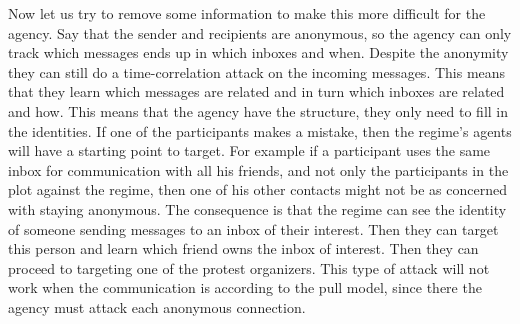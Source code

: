 Now let us try to remove some information to make this more difficult for the 
agency.
Say that the sender and recipients are anonymous, so the agency can only track 
which messages ends up in which inboxes and when.
Despite the anonymity they can still do a time-correlation attack on the 
incoming messages.
This means that they learn which messages are related and in turn which inboxes 
are related and how.
This means that the agency have the structure, they only need to fill in the 
identities.
If one of the participants makes a mistake, then the regime's agents will have 
a starting point to target.
For example if a participant uses the same inbox for communication with all his 
friends, and not only the participants in the plot against the regime, then one 
of his other contacts might not be as concerned with staying anonymous.
The consequence is that the regime can see the identity of someone sending 
messages to an inbox of their interest.
Then they can target this person and learn which friend owns the inbox of 
interest.
Then they can proceed to targeting one of the protest organizers.
This type of attack will not work when the communication is according to the 
pull model, since there the agency must attack each anonymous connection.
